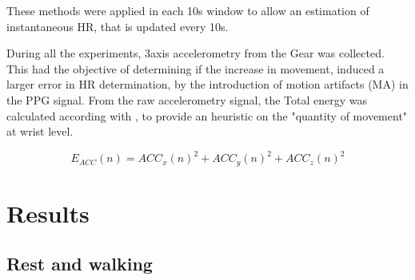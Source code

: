 These methods were applied in each 10s window to allow an estimation of instantaneous HR, that is updated every 10s.

During all the experiments, 3axis accelerometry from the Gear was collected. This had the objective of determining if the increase in movement, induced a larger error in HR determination, by the introduction of motion artifacts (MA) in the PPG signal. From the raw accelerometry signal, the Total energy was calculated according with , to provide an heuristic on the "quantity of movement" at wrist level.

\begin{equation}
	E_{ACC}(n)= {{ACC}_{x}(n)}^{2}+{{ACC}_{y}(n)}^{2}+{{ACC}_{z}(n)}^{2}
	\label{eq:acc_energy}
\end{equation}


\FloatBarrier

\section{Results}

\subsection{Rest and walking}



